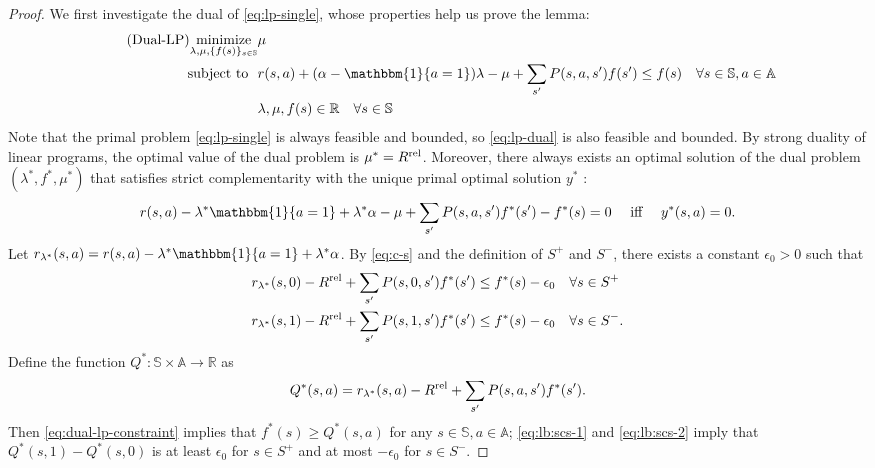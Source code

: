 \documentclass[11pt,letterpaper]{article}
\theoremstyle{plain}
\theoremstyle{definition}
\theoremstyle{remark}
\newcommand{\R}{\mathbb{R}}
\newcommand{\indibrac}[1]{\mathbbm{1}\!\left\{#1\right\}}
\newcommand{\sspa}{\mathbb{S}}
\newcommand{\aspa}{\mathbb{A}}
\newcommand{\rel}{\textup{rel}} %
\newcommand{\ravg}{R}
\newcommand{\rrel}{\ravg^\rel}
\newcommand{\vlam}{f^*}
\newcommand{\qlam}{Q^*}
\newcommand{\rlam}{r_{\lambda^*}}
\newcommand{\rewardgap}{\epsilon_0}
\begin{document}
\begin{proof}%
    We first investigate the dual of \eqref{eq:lp-single}, whose properties help us prove the lemma: 
    \begin{align}
        \tag{Dual-LP}\label{eq:lp-dual} \underset{\lambda, \mu, \{f(s)\}_{s\in\sspa}}{\text{minimize}} &  \mu \\
        \text{subject to}\mspace{12mu}
        \label{eq:dual-lp-constraint}
        &  r(s,a) +  (\alpha - \indibrac{a=1}) \lambda - \mu  + \sum_{s'} P(s,a,s')f(s') \leq f(s)  \quad \forall s\in\sspa, a\in\aspa \\
        \nonumber
        & \lambda, \mu, f(s) \in \R \quad \forall s\in\sspa
    \end{align}
    Note that the primal problem \eqref{eq:lp-single} is always feasible and bounded, so \eqref{eq:lp-dual} is also feasible and bounded. 
    By strong duality of linear programs, the optimal value of the dual problem is $\mu^* = \rrel$. 
    Moreover, there always exists an optimal solution of the dual problem $(\lambda^*, \vlam, \mu^*)$ that satisfies strict complementarity with the unique primal optimal solution $y^*$ \citep{GolTuc_56_strict_cs}: 
    \begin{equation}
        \label{eq:c-s}
        r(s,a) - \lambda^* \indibrac{a=1} + \lambda^* \alpha - \mu  + \sum_{s'} P(s,a,s')\vlam(s') - \vlam(s) = 0 \quad \text{ iff } \quad y^*(s,a) = 0.
    \end{equation}
    Let $\rlam(s,a) = r(s,a) -  \lambda^* \indibrac{a=1} + \lambda^* \alpha$. 
    By \eqref{eq:c-s} and the definition of $S^+$ and $S^-$, 
    there exists a constant $\rewardgap > 0$ such that 
    \begin{align}
        \label{eq:lb:scs-1}
         \rlam(s, 0) - \rrel + \sum_{s'} P(s,0,s')\vlam(s') &\leq \vlam(s) - \rewardgap   \quad \forall s\in S^+ \\
        \label{eq:lb:scs-2}
          \rlam(s, 1) - \rrel + \sum_{s'} P(s,1,s')\vlam(s') &\leq \vlam(s) - \rewardgap \quad \forall s\in S^-.
    \end{align} 
    Define the function $\qlam\colon \sspa\times \aspa \to \R$ as
    \[
        \qlam(s,a) = \rlam(s,a) - \rrel + \sum_{s'} P(s,a,s')\vlam(s').
    \]
    Then \eqref{eq:dual-lp-constraint} implies that $\vlam(s) \geq \qlam(s,a)$ for any $s\in\sspa,a\in\aspa$; 
    \eqref{eq:lb:scs-1} and \eqref{eq:lb:scs-2} imply that $\qlam(s,1) - \qlam(s,0)$ is at least $\rewardgap$ for $s\in S^+$ and at most $-\rewardgap$ for $s\in S^-$. 
    

\end{proof}
\end{document}
